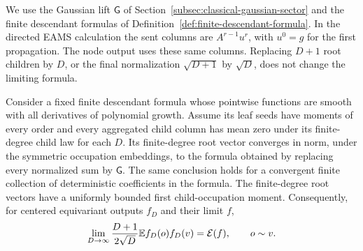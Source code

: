 We use the Gaussian lift $\mathsf G$ of
Section~\ref{subsec:classical-gaussian-sector} and the finite descendant
formulas of Definition~\ref{def:finite-descendant-formula}.
In the directed
EAMS calculation the sent columns are $A^{r-1}u^r$, with $u^0=g$
for the first propagation.  The node output uses these same columns.
Replacing $D+1$ root children by $D$, or the final normalization
$\sqrt{D+1}$ by $\sqrt D$, does not change the limiting formula.

\begin{lemma}
\label{lem:classical-strong-limit}
Consider a fixed finite descendant formula whose pointwise functions
are smooth with all derivatives of polynomial growth.  Assume its
leaf seeds have moments of every order and every aggregated child
column has mean zero under its finite-degree child law for each $D$.
Its finite-degree root vector converges in
norm, under the symmetric occupation embeddings, to the formula
obtained by replacing every normalized sum by $\mathsf G$.
The same conclusion holds for a convergent finite collection of
deterministic coefficients in the formula.  The finite-degree root
vectors have a uniformly bounded first child-occupation moment.
Consequently, for centered equivariant outputs $f_D$ and their limit
$f$,
\begin{equation}
 \lim_{D\to\infty}\frac{D+1}{2\sqrt D}\mathbb E f_D(o)f_D(v)
       =\mathcal E(f),\qquad o\sim v.
 \label{eq:classical-energy-transfer}
\end{equation}
\end{lemma}

